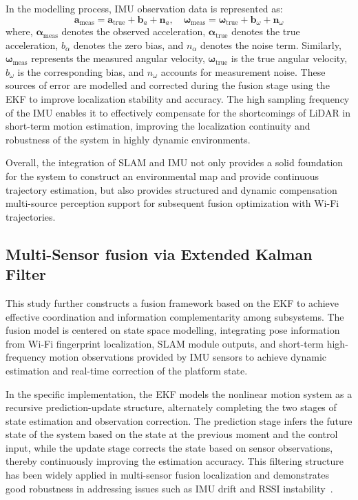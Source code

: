 \documentclass[12pt,a4paper]{article}
\numberwithin{equation}{section}
\begin{document}
In the modelling process, IMU observation data is represented as:
\begin{equation}
  \boldsymbol{a}_{\text{meas}} = \boldsymbol{a}_{\text{true}} + \boldsymbol{b}_a + \boldsymbol{n}_a,
  \quad
  \boldsymbol{\omega}_{\text{meas}} = \boldsymbol{\omega}_{\text{true}} + \boldsymbol{b}_\omega + \boldsymbol{n}_\omega
\end{equation}
where, $\boldsymbol{\alpha}_{\text{meas}}$ denotes the observed acceleration,
$\boldsymbol{\alpha}_{\text{true}}$ denotes the true acceleration, ${b}_\alpha$
denotes the zero bias, and ${n}_\alpha$ denotes the noise term. Similarly,
$\boldsymbol{\omega}_{\text{meas}}$ represents the measured angular velocity,
$\boldsymbol{\omega}_{\text{true}}$ is the true angular velocity, ${b}_\omega$
is the corresponding bias, and ${n}_\omega$ accounts for measurement
noise. These sources of error are modelled and corrected during the fusion stage
using the EKF to improve localization stability and accuracy. The high sampling
frequency of the IMU enables it to effectively compensate for the shortcomings
of LiDAR in short-term motion estimation, improving the localization continuity
and robustness of the system in highly dynamic environments.

Overall, the integration of SLAM and IMU not only provides a solid foundation
for the system to construct an environmental map and provide continuous
trajectory estimation, but also provides structured and dynamic compensation
multi-source perception support for subsequent fusion optimization with Wi-Fi
trajectories.

\subsection{Multi-Sensor fusion via Extended Kalman Filter}
This study further constructs a fusion framework based on the EKF to achieve
effective coordination and information complementarity among subsystems. The
fusion model is centered on state space modelling, integrating pose information
from Wi-Fi fingerprint localization, SLAM module outputs, and short-term
high-frequency motion observations provided by IMU sensors to achieve dynamic
estimation and real-time correction of the platform state.

In the specific implementation, the EKF models the nonlinear motion system as a
recursive prediction-update structure, alternately completing the two stages of
state estimation and observation correction. The prediction stage infers the
future state of the system based on the state at the previous moment and the
control input, while the update stage corrects the state based on sensor
observations, thereby continuously improving the estimation accuracy. This
filtering structure has been widely applied in multi-sensor fusion localization
and demonstrates good robustness in addressing issues such as IMU drift and RSSI
instability~\cite{zhuang2023multi}.
\end{document}

